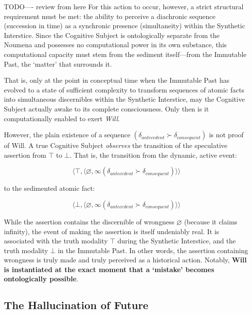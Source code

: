 \documentclass[11pt, a4paper]{article}
\theoremstyle{formalism}
\begin{document}
TODO---- review from here
For this action to occur, however, a strict structural requirement must be met:
the ability to perceive a diachronic sequence (succession in time) as a
synchronic presence (simultaneity) within the Synthetic Interstice. Since the
Cognitive Subject is ontologically separate from the Noumena and possesses no
computational power in its own substance, this computational capacity must stem
from the sediment itself---from the Immutable Past, the `matter' that surrounds
it.

That is, only at the point in conceptual time when the Immutable Past has
evolved to a state of sufficient complexity to transform sequences of atomic
facts into simultaneous discernibles within the Synthetic Interstice, may the
Cognitive Subject actually awake to its complete consciousness. Only then is it
computationally enabled to exert \textit{Will}.

However, the plain existence of a sequence $(\delta_{antecedent} \succ
\delta_{consequent})$ is not proof of Will. A true Cognitive Subject
\textit{observes} the transition of the speculative assertion from $\top$ to
$\bot$. That is, the transition from the dynamic, active event:

\begin{equation}
    \langle \top, \langle \varnothing, \infty(\delta_{antecedent} \succ \delta_{consequent}) \rangle \rangle 
\end{equation}

to the sedimented atomic fact:

\begin{equation}
    \langle \bot, \langle \varnothing, \infty(\delta_{antecedent} \succ \delta_{consequent}) \rangle \rangle 
\end{equation}

While the assertion contains the discernible of wrongness $\varnothing$ (because
it claims infinity), the event of making the assertion is itself undeniably real.
It is associated with the truth modality $\top$ during the Synthetic Interstice,
and the truth modality $\bot$ in the Immutable Past. In other words, the
assertion containing wrongness is truly made and truly perceived as a historical
action. Notably, \textbf{Will is instantiated at the exact moment that a `mistake'
becomes ontologically possible}.

\subsection{The Hallucination of Future}
\end{document}
